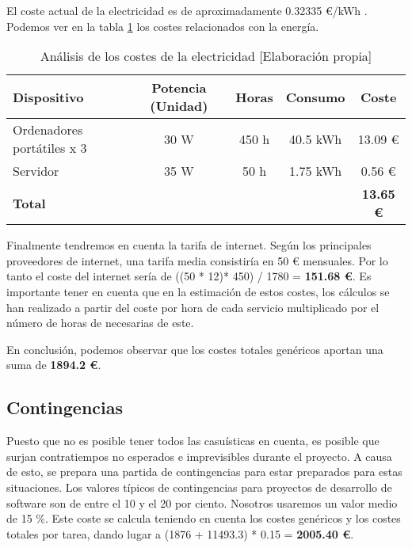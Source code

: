 El coste actual de la electricidad es de aproximadamente 0.32335 €/kWh \cite{precioLuz}. Podemos ver en la tabla \ref{tab:energia} los costes relacionados con la energía.

\begin{table}[h]
    \begin{center}
        \begin{tabular}{ l  c  c  c  c }
        \textbf{Dispositivo} & \textbf{Potencia (Unidad)} & \textbf{Horas} & \textbf{Consumo} & \textbf{Coste} \\
        \hline
        Ordenadores portátiles x 3 & 30 W & 450 h & 40.5 kWh & 13.09 € \\
        Servidor & 35 W & 50 h & 1.75 kWh & 0.56 € \\
        \hline
        \textbf{Total} & & & & \textbf{13.65 €} \\
        \end{tabular}
        \caption{Análisis de los costes de la electricidad [Elaboración propia]}
        \label{tab:energia}
    \end{center}
\end{table}

Finalmente tendremos en cuenta la tarifa de internet. Según los principales proveedores de internet, una tarifa media consistiría en 50 € mensuales. Por lo tanto el coste del internet sería de ((50 * 12)* 450) / 1780 = \textbf{151.68 €}. Es importante tener en cuenta que en la estimación de estos costes, los cálculos se han realizado a partir del coste por hora de cada servicio multiplicado por el número de horas de necesarias de este.

En conclusión, podemos observar que los costes totales genéricos aportan una suma de \textbf{1894.2 €}.

\subsection{Contingencias}

Puesto que no es posible tener todos las casuísticas en cuenta, es posible que surjan contratiempos no esperados e imprevisibles durante el proyecto. A causa de esto, se prepara una partida de contingencias para estar preparados para estas situaciones. Los valores típicos de contingencias para proyectos de desarrollo de software son de entre el 10 y el 20 por ciento. Nosotros usaremos un valor medio de 15 \%. Este coste se calcula teniendo en cuenta los costes genéricos y los costes totales por tarea, dando lugar a (1876 + 11493.3) * 0.15 = \textbf{2005.40 €}.

